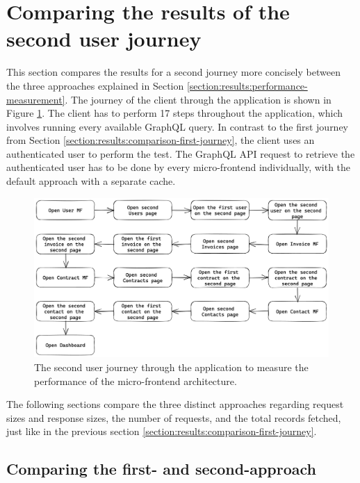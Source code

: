 \section{Comparing the results of the second user journey}\label{section:results:comparison-second-journey}

This section compares the results for a second journey more concisely between the three approaches explained in Section \ref{section:results:performance-measurement}. The journey of the client through the application is shown in Figure \ref{fig:results:evaluation-second-path}. The client has to perform 17 steps throughout the application, which involves running every available GraphQL query. In contrast to the first journey from Section \ref{section:results:comparison-first-journey}, the client uses an authenticated user to perform the test. The GraphQL \ac{API} request to retrieve the authenticated user has to be done by every micro-frontend individually, with the default approach with a separate cache.

\ifshowImages
\begin{figure}[H]
\centering
\includegraphics[width=1\linewidth]{images/results/evaluation-second-path.png}
\caption{The second user journey through the application to measure the performance of the micro-frontend architecture.}\label{fig:results:evaluation-second-path}
\end{figure}
\fi

\noindent The following sections compare the three distinct approaches regarding request sizes and response sizes, the number of requests, and the total records fetched, just like in the previous section \ref{section:results:comparison-first-journey}.

\subsection{Comparing the first- and second-approach}\label{subsection:results:comparison-second-path-first-second-approach}

